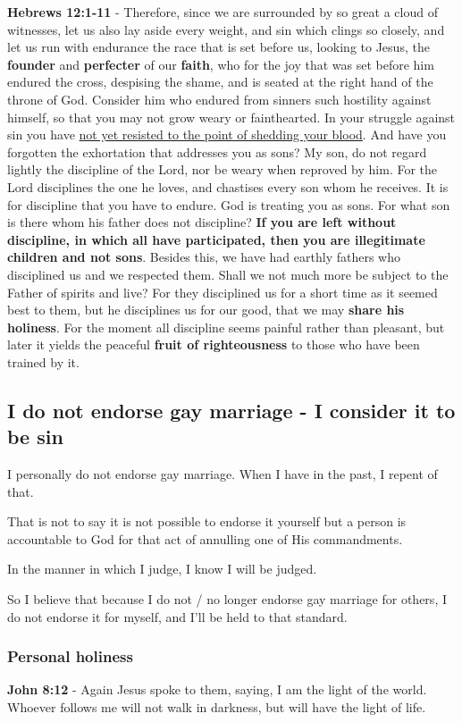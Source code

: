 \documentclass[11pt]{article}
\begin{document}
\textbf{Hebrews 12:1-11} - Therefore, since we are surrounded by so great a cloud of witnesses, let us also lay aside every weight, and sin which clings so closely, and let us run with endurance the race that is set before us, looking to Jesus, the \textbf{founder} and \textbf{perfecter} of our \textbf{faith}, who for the joy that was set before him endured the cross, despising the shame, and is seated at the right hand of the throne of God. Consider him who endured from sinners such hostility against himself, so that you may not grow weary or fainthearted. In your struggle against sin you have \uline{not yet resisted to the point of shedding your blood}. And have you forgotten the exhortation that addresses you as sons? My son, do not regard lightly the discipline of the Lord, nor be weary when reproved by him. For the Lord disciplines the one he loves, and chastises every son whom he receives. It is for discipline that you have to endure. God is treating you as sons. For what son is there whom his father does not discipline? \textbf{If you are left without discipline, in which all have participated, then you are illegitimate children and not sons}. Besides this, we have had earthly fathers who disciplined us and we respected them. Shall we not much more be subject to the Father of spirits and live? For they disciplined us for a short time as it seemed best to them, but he disciplines us for our good, that we may \textbf{share his holiness}. For the moment all discipline seems painful rather than pleasant, but later it yields the peaceful \textbf{fruit of righteousness} to those who have been trained by it.

\subsection{I do not endorse gay marriage - I consider it to be sin}
\label{sec:orgef4e6ae}
I personally do not endorse gay marriage. When I have in the past, I repent of that.

That is not to say it is not possible to
endorse it yourself but a person is
accountable to God for that act of annulling
one of His commandments.

In the manner in which I judge, I know I will
be judged.

So I believe that because I do not / no longer
endorse gay marriage for others, I do not
endorse it for myself, and I'll be held to
that standard.

\subsubsection{Personal holiness}
\label{sec:org5972038}
\textbf{John 8:12} - Again Jesus spoke to them, saying, I am the light of the world. Whoever follows me will not walk in darkness, but will have the light of life.
\end{document}
